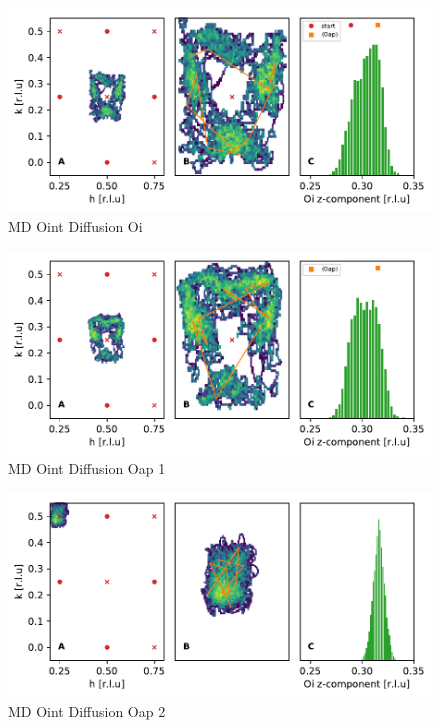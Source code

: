 \begin{figure}
	\centering
	\includegraphics[width=\textwidth]{fig/md/diffusion1.pdf}
	\caption[MD Oint Diffusion Oi]{MD Oint Diffusion Oi}
	\label{fig:md_diffusion1}
\end{figure}

\begin{figure}
	\centering
	\includegraphics[width=\textwidth]{fig/md/diffusion2.pdf}
	\caption[MD Oint Diffusion Oap 1]{MD Oint Diffusion Oap 1}
	\label{fig:md_diffusion2}
\end{figure}

\begin{figure}
	\centering
	\includegraphics[width=\textwidth]{fig/md/diffusion3.pdf}
	\caption[MD Oint Diffusion Oap 2]{MD Oint Diffusion Oap 2}
	\label{fig:md_diffusion3}
\end{figure}


